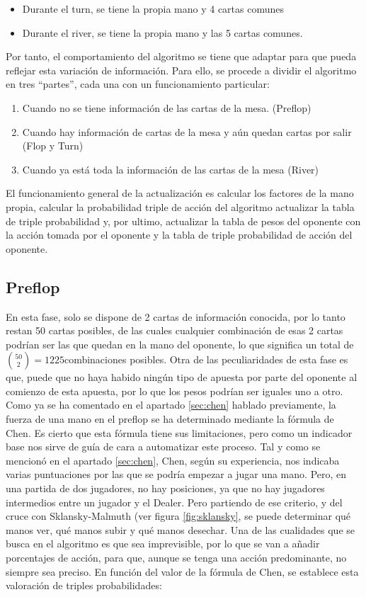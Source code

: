 \begin{itemize}
\begin{itemize}
\item Durante el turn, se tiene la propia mano y 4 cartas comunes
\item Durante el river, se tiene la propia mano y las 5 cartas comunes.
\end{itemize}
Por tanto, el comportamiento del algoritmo  se tiene que adaptar para que pueda reflejar esta variación de información.
Para ello, se procede a dividir el algoritmo en tres “partes”, cada una con un funcionamiento particular:
\begin{enumerate}
\item Cuando no se tiene información de las cartas de la mesa. (Preflop)
\item Cuando hay información de cartas de la mesa y aún quedan cartas por salir (Flop y Turn)
\item Cuando ya está toda la información de las cartas de la mesa (River)
\end{enumerate}

\end{itemize} 

El funcionamiento general de la actualización es calcular los factores de la mano propia, calcular la probabilidad triple de acción del algoritmo actualizar la tabla de triple probabilidad y, por ultimo,  actualizar la tabla de pesos del oponente con la acción tomada por el oponente y la tabla de triple probabilidad de acción del oponente. 

\subsection{Preflop}

En esta fase, solo se dispone de 2 cartas de información conocida, por lo tanto restan 50 cartas posibles, de las cuales cualquier combinación de esas 2 cartas podrían ser las que quedan en la mano del oponente, lo que significa un total de $\binom{50}{2} = 1225 $combinaciones posibles.
Otra de las peculiaridades de esta fase es que, puede que no haya habido ningún tipo de apuesta por parte del oponente al comienzo de esta apuesta, por lo que los pesos podrían ser iguales uno a otro.
Como ya se ha comentado en el apartado \ref{sec:chen} hablado previamente, la fuerza de una mano en el preflop se ha determinado mediante la fórmula de Chen. Es cierto que esta fórmula tiene sus limitaciones, pero como un indicador base nos sirve de guía de cara a automatizar este proceso.
Tal y como se mencionó en el apartado \ref{sec:chen}, Chen, según su experiencia, nos indicaba varias puntuaciones por las que se podría empezar a jugar una mano.\cite{krieger} Pero, en una partida de dos jugadores, no hay posiciones, ya que no hay jugadores intermedios entre un jugador y el Dealer. Pero partiendo de ese criterio, y del cruce con Sklansky-Malmuth (ver figura \ref{fig:sklansky},  se puede determinar qué manos ver, qué manos subir y qué manos desechar. 
Una de las cualidades que se busca  en el algoritmo es que sea imprevisible, por lo que se van a añadir porcentajes de acción, para que, aunque se tenga una acción predominante, no siempre sea preciso.
En función del valor de la fórmula de Chen, se establece esta valoración de triples probabilidades:


